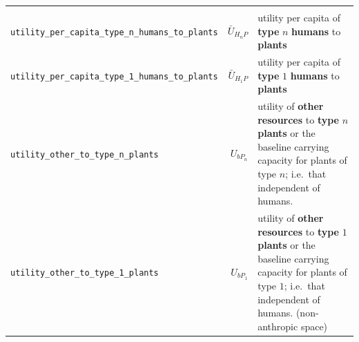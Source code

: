 \documentclass[
]{book}
\begin{document}
\begin{longtable}[]{@{}lrl@{}}
\begin{minipage}[t]{0.39\columnwidth}
\end{minipage}\tabularnewline
\begin{minipage}[t]{0.27\columnwidth}\raggedright
\texttt{utility\_per\_capita\_type\_n\_humans\_to\_plants}\strut
\end{minipage} & \begin{minipage}[t]{0.25\columnwidth}\raggedleft
\(\bar{U}_{H_{n}P}\)\strut
\end{minipage} & \begin{minipage}[t]{0.39\columnwidth}\raggedright
utility per capita of \textbf{type} \(n\) \textbf{humans} to \textbf{plants}\strut
\end{minipage}\tabularnewline
\begin{minipage}[t]{0.27\columnwidth}\raggedright
\texttt{utility\_per\_capita\_type\_1\_humans\_to\_plants}\strut
\end{minipage} & \begin{minipage}[t]{0.25\columnwidth}\raggedleft
\(\bar{U}_{H_{1}P}\)\strut
\end{minipage} & \begin{minipage}[t]{0.39\columnwidth}\raggedright
utility per capita of \textbf{type} \(1\) \textbf{humans} to \textbf{plants}\strut
\end{minipage}\tabularnewline
\begin{minipage}[t]{0.27\columnwidth}\raggedright
\texttt{utility\_other\_to\_type\_n\_plants}\strut
\end{minipage} & \begin{minipage}[t]{0.25\columnwidth}\raggedleft
\(U_{bP_{n}}\)\strut
\end{minipage} & \begin{minipage}[t]{0.39\columnwidth}\raggedright
utility of \textbf{other resources} to \textbf{type} \(n\) \textbf{plants} or the baseline carrying capacity for plants of type \(n\); i.e.~that independent of humans.\strut
\end{minipage}\tabularnewline
\begin{minipage}[t]{0.27\columnwidth}\raggedright
\texttt{utility\_other\_to\_type\_1\_plants}\strut
\end{minipage} & \begin{minipage}[t]{0.25\columnwidth}\raggedleft
\(U_{bP_{1}}\)\strut
\end{minipage} & \begin{minipage}[t]{0.39\columnwidth}\raggedright
utility of \textbf{other resources} to \textbf{type} \(1\) \textbf{plants} or the baseline carrying capacity for plants of type \(1\); i.e.~that independent of humans. (non-anthropic space)\strut

\end{minipage}
\end{longtable}
\end{document}

